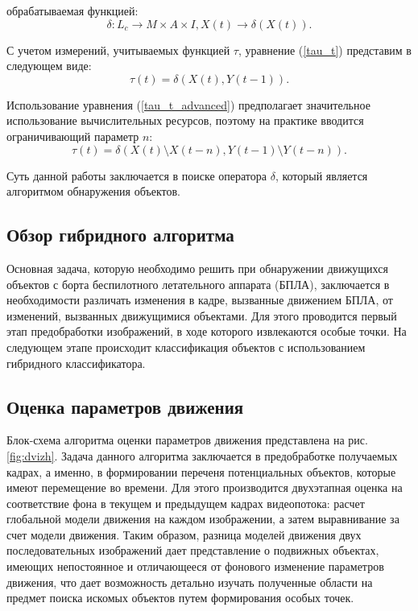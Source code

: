 обрабатываемая функцией:
\begin{equation}
\delta : L_c \rightarrow M \times A \times I, X(t) \rightarrow \delta(X(t)).
\end{equation}

С учетом измерений, учитываемых функцией $\tau$, уравнение (\ref{tau_t}) представим в следующем виде:
\begin{equation}
\label{tau_t_advanced}
\tau(t) = \delta(X(t), Y(t - 1)).
\end{equation}

Использование уравнения (\ref{tau_t_advanced}) предполагает значительное использование вычислительных ресурсов, поэтому на практике вводится ограничивающий параметр $n$:
\begin{equation}
\tau(t) = \delta(X(t) \setminus X(t - n), Y(t - 1) \setminus Y(t - n)).
\end{equation}

Суть данной работы заключается в поиске оператора $\delta$, который является алгоритмом обнаружения объектов.
\subsection{Обзор гибридного алгоритма}
Основная задача, которую необходимо решить при обнаружении движущихся объектов с борта беспилотного летательного аппарата (БПЛА), заключается в необходимости различать изменения в кадре, вызванные движением БПЛА, от изменений, вызванных движущимися объектами. Для этого проводится первый этап предобработки изображений, в ходе которого извлекаются особые точки. На следующем этапе происходит классификация объектов с использованием гибридного классификатора.
\subsection{Оценка параметров движения}
Блок-схема алгоритма оценки параметров движения представлена на рис. \ref{fig:dvizh}. Задача данного алгоритма заключается в предобработке получаемых кадрах, а именно, в формировании переченя потенциальных объектов, которые имеют перемещение во времени. Для этого производится двухэтапная оценка на соответствие фона в текущем и предыдущем кадрах видеопотока: расчет глобальной модели движения на каждом изображении, а затем выравнивание за счет модели движения. Таким образом, разница моделей движения двух последовательных изображений дает представление о подвижных объектах, имеющих непостоянное и отличающееся от фонового изменение параметров движения, что дает возможность детально изучать полученные области на предмет поиска искомых объектов путем формирования особых точек.

